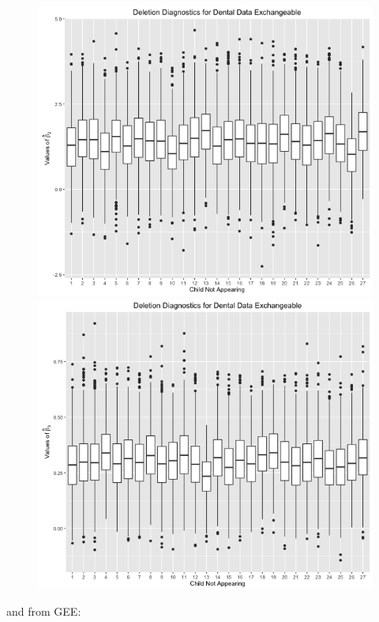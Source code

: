 \documentclass[11pt]{article}
\begin{document}
\begin{enumerate}
\begin{figure}[H]
			\includegraphics[scale=0.4]{RplotDDExchBeta2.png}
			\includegraphics[scale=0.4]{RplotDDExchBeta3.png}
		\end{figure}
		and from GEE:
		\begin{figure}[H]

\end{figure}
\end{enumerate}
\end{document}
